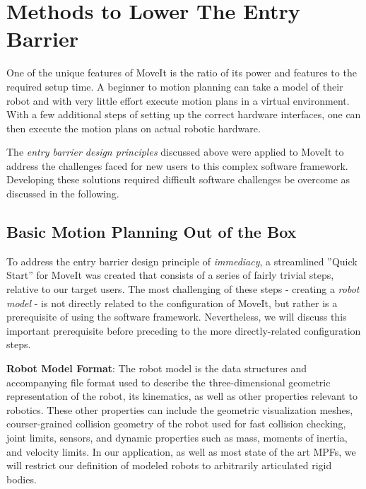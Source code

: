 \documentclass[10pt,journal,compsoc]{joser1}
\begin{document}
{%
\section{Methods to Lower The Entry Barrier}
\label{sec::lowering_barriers}

One of the unique features of MoveIt is the ratio of its power and features to the required setup time. A beginner to motion planning can take a model of their robot and with very little effort execute motion plans in a virtual environment. With a few additional steps of setting up the correct hardware interfaces, one can then execute the motion plans on actual robotic hardware.

The \textit{entry barrier design principles} discussed above were applied to MoveIt to address the challenges faced for new users to this complex software framework. Developing these solutions required difficult software challenges be overcome as discussed in the following.

\subsection{Basic Motion Planning Out of the Box}

To address the entry barrier design principle of \textit{immediacy}, a streamlined ''Quick Start'' for MoveIt was created that consists of a series of fairly trivial steps, relative to our target users. The most challenging of these steps - creating a \textit{robot model} - is not directly related to the configuration of MoveIt, but rather is a prerequisite of using the software framework. Nevertheless, we will discuss this important prerequisite before preceding to the more directly-related configuration steps. 

{\bf Robot Model Format}: The robot model is the data structures and accompanying file format used to describe the three-dimensional geometric representation of the robot, its kinematics, as well as other properties relevant to robotics. These other properties can include the geometric visualization meshes, courser-grained collision geometry of the robot used for fast collision checking, joint limits, sensors, and dynamic properties such as mass, moments of inertia, and velocity limits. In our application, as well as most state of the art MPFs, we will restrict our definition of modeled robots to arbitrarily articulated rigid bodies.

}
\end{document}
